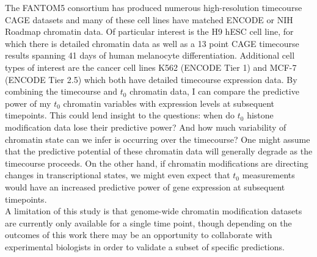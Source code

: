 \documentclass[a4paper]{report}
\begin{document}
The FANTOM5 consortium has produced numerous high-resolution
timecourse CAGE datasets and many of these cell lines have matched
ENCODE or NIH Roadmap chromatin data. Of particular interest is the H9
hESC cell line, for which there is detailed chromatin data as well as
a 13 point CAGE timecourse results spanning 41 days of human
melanocyte differentiation. Additional cell types of interest are
the cancer cell lines K562 (ENCODE Tier 1) and MCF-7 (ENCODE Tier 2.5)
which both have detailed timecourse expression data. By combining the
timecourse and $t_0$ chromatin data, I can compare the predictive power of
my $t_0$ chromatin variables with expression levels at subsequent
timepoints. This could lend insight to the questions: when do $t_0$
histone modification data lose their predictive power? And how much
variability of chromatin state can we infer is occurring over the
timecourse? One might assume that the predictive potential of these
chromatin data will generally degrade as the timecourse proceeds. On
the other hand, if chromatin modifications are directing changes in
transcriptional states, we might even
expect that $t_0$ measurements would have an increased predictive
power of gene expression at subsequent timepoints. \\

A limitation of this study is that genome-wide chromatin modification
datasets are currently only available for a single time point, though depending on the
outcomes of this work there may be an opportunity to collaborate with
experimental biologists in order to validate a subset of specific predictions.
\clearpage
\end{document}
